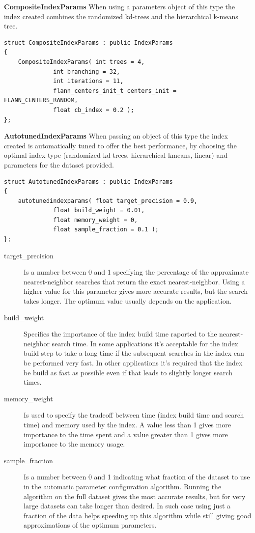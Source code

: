 \documentclass[letter,10pt]{article}
\begin{document}
\begin{description}
\textbf{CompositeIndexParams} When using a parameters object of this type the index created combines the randomized kd-trees 
	and the hierarchical k-means tree.
\begin{Verbatim}[fontsize=\footnotesize]
struct CompositeIndexParams : public IndexParams
{
	CompositeIndexParams( int trees = 4,
			  int branching = 32,
			  int iterations = 11,
			  flann_centers_init_t centers_init = FLANN_CENTERS_RANDOM, 
			  float cb_index = 0.2 );
};
\end{Verbatim}


\textbf{AutotunedIndexParams}
  When passing an object of this type the index created is automatically tuned to offer 
the best performance, by choosing the optimal index type (randomized kd-trees, hierarchical kmeans, linear) and parameters for the
dataset provided.
\begin{Verbatim}[fontsize=\footnotesize]
struct AutotunedIndexParams : public IndexParams
{
	autotunedindexparams( float target_precision = 0.9,
			  float build_weight = 0.01,
			  float memory_weight = 0,
			  float sample_fraction = 0.1 );
};
\end{Verbatim}
\begin{description}
\item[target\_precision]{ Is a number between 0 and 1 specifying the
percentage of the approximate nearest-neighbor searches that return the
exact nearest-neighbor. Using a higher value for this parameter gives
more accurate results, but the search takes longer. The optimum value
usually depends on the application. }

\item[build\_weight]{ Specifies the importance of the
index build time raported to the nearest-neighbor search time. In some
applications it's acceptable for the index build step to take a long time
if the subsequent searches in the index can be performed very fast. In
other applications it's required that the index be build as fast as
possible even if that leads to slightly longer search times.}

\item[memory\_weight]{Is used to specify the tradeoff between
time (index build time and search time) and memory used by the index. A
value less than 1 gives more importance to the time spent and a value
greater than 1 gives more importance to the memory usage.}

\item[sample\_fraction]{Is a number between 0 and 1 indicating what fraction
of the dataset to use in the automatic parameter configuration algorithm. Running the 
algorithm on the full dataset gives the most accurate results, but for
very large datasets can take longer than desired. In such case using just a fraction of the
data helps speeding up this algorithm while still giving good approximations of the
optimum parameters.}
\end{description}


\end{description}
\end{document}
